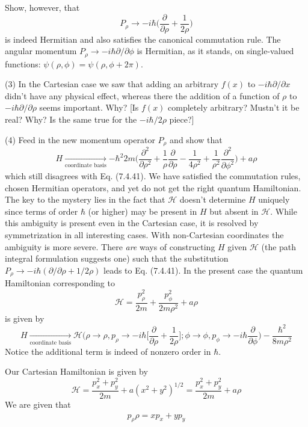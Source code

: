 \documentclass[../principles-of-quantum-mechanics.tex]{subfiles}
\begin{document}
\begin{questions}
		Show, however, that
		$$P_\rho \to {-i\hbar}\Big(\frac{\partial}{\partial \rho} + \frac{1}{2\rho}\Big)$$
		is indeed Hermitian and also satisfies the canonical commutation rule. The angular momentum $P_\rho \to {-i\hbar\partial/\partial \phi}$ is Hermitian, as it stands, on single-valued functions: $\psi(\rho, \phi) = \psi(\rho, \phi+ 2\pi)$.
		
		(3) In the Cartesian case we saw that adding an arbitrary $f(x)$ to ${-i\hbar\partial/\partial x}$ didn't have any physical effect, whereas there the addition of a function of $\rho$ to ${-i\hbar\partial / \partial \rho}$ seems important. Why? [Is $f(x)$ completely arbitrary? Mustn't it be real? Why? Is the same true for the ${-i\hbar/2\rho}$ piece?]
		
		(4) Feed in the new momentum operator $P_\rho$ and show that
		$$H\xrightarrow[\text{coordinate basis}]{} {-\hbar^2}{2m}\Big(\frac{\partial^2}{\partial \rho^2} + \frac{1}{\rho}\frac{\partial}{\partial \rho} - \frac{1}{4\rho^2} + \frac{1}{\rho^2}\frac{\partial^2}{\partial \phi^2}\Big) + a\rho$$
		which still disagrees with Eq. (7.4.41). We have satisfied the commutation rules, chosen Hermitian operators, and yet do not get the right quantum Hamiltonian. The key to the mystery lies in the fact that $\mathcal{H}$ doesn't determine $H$ uniquely since terms of order $\hbar$ (or higher) may be present in $H$ but absent in $\mathcal{H}$. While this ambiguity is present even in the Cartesian case, it is resolved by symmetrization in all interesting cases. With non-Cartesian coordinates the ambiguity is more severe. There \textit{are} ways of constructing $H$ given $\mathcal{H}$ (the path integral formulation suggests one) such that the substitution $P_\rho \to {-i\hbar(\partial / \partial \rho + 1/2\rho)}$ leads to Eq. (7.4.41). In the present case the quantum Hamiltonian corresponding to 
		$$\mathcal{H} = \frac{p_\rho^2}{2m}+ \frac{p_\phi^2}{2m\rho^2} + a\rho$$
		is given by
		$$H \xrightarrow[\text{coordinate basis}]{} \mathcal{H}\Big(\rho \to \rho, p_\rho \to {-i\hbar}\Big[\frac{\partial}{\partial \rho} + \frac{1}{2\rho}\Big]; \phi \to \phi, p_\phi \to {-i\hbar}\frac{\partial}{\partial \phi}\Big) - \frac{\hbar^2}{8m\rho^2}$$
		Notice the additional term is indeed of nonzero order in $\hbar$.
		\begin{solution}
			Our Cartesian Hamiltonian is given by
			$$\mathcal{H} = \frac{p_x^2 + p_y^2}{2m} + a(x^2 + y^2)^{1/2} = \frac{p_x^2 + p_y^2}{2m} + a\rho$$
			We are given that
			\begin{align*}
				p_\rho\rho = xp_x + yp_y \\

\end{align*}
\end{solution}
\end{questions}
\end{document}
